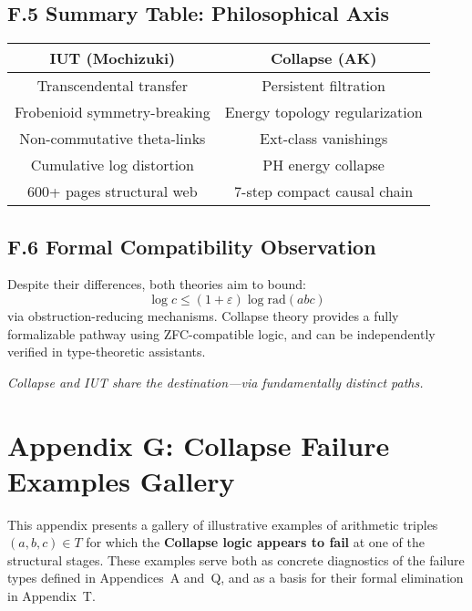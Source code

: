 \documentclass[11pt]{article}
\begin{document}
\subsection*{F.5 Summary Table: Philosophical Axis}

\begin{tabular}{|c|c|}
\hline
\textbf{IUT (Mochizuki)} & \textbf{Collapse (AK)} \\
\hline
Transcendental transfer & Persistent filtration \\
Frobenioid symmetry-breaking & Energy topology regularization \\
Non-commutative theta-links & Ext-class vanishings \\
Cumulative log distortion & PH energy collapse \\
600+ pages structural web & 7-step compact causal chain \\
\hline
\end{tabular}

\subsection*{F.6 Formal Compatibility Observation}

Despite their differences, both theories aim to bound:
\[
\log c \leq (1 + \varepsilon) \log \mathrm{rad}(abc)
\]
via obstruction-reducing mechanisms. Collapse theory provides a fully formalizable pathway  
using ZFC-compatible logic, and can be independently verified in type-theoretic assistants.

\begin{center}
\textit{Collapse and IUT share the destination—via fundamentally distinct paths.}
\end{center}



\section*{Appendix G: Collapse Failure Examples Gallery}

This appendix presents a gallery of illustrative examples of arithmetic triples \( (a,b,c) \in T \)  
for which the \textbf{Collapse logic appears to fail} at one of the structural stages.  
These examples serve both as concrete diagnostics of the failure types defined in Appendices~A and~Q,  
and as a basis for their formal elimination in Appendix~T.
\end{document}
